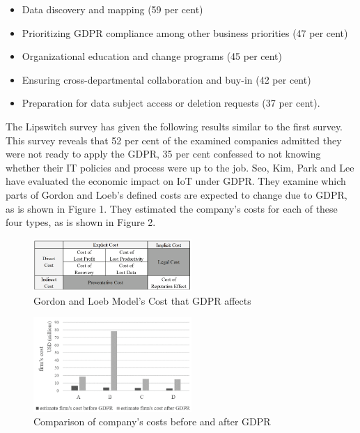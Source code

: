 \documentclass[11pt,english]{article}
\begin{document}
\begin{itemize}
  \item Data discovery and mapping (59 per cent)
  \item Prioritizing GDPR compliance among other business priorities (47 per cent)
  \item Organizational education and change programs (45 per cent)
  \item Ensuring cross-departmental collaboration and buy-in (42 per cent)
  \item Preparation for data subject access or deletion requests (37 per cent).
\end{itemize}
\quad The Lipswitch survey \cite{lipswitch} has given the following results similar to the first survey. This survey reveals that 52 per cent of the examined companies admitted they were not ready to apply the GDPR, 35 per cent confessed to not knowing whether their IT policies and process were up to the job. Seo, Kim, Park and Lee \cite{8190804} have evaluated the economic impact on IoT under
GDPR. They examine which parts of Gordon and Loeb's defined costs \cite{gordon2002economics} are expected to change due to GDPR, as is shown in Figure 1. They estimated the company’s costs for each of these four types, as is shown in Figure 2.
\begin{figure}[htp]
    \centering
    \includegraphics[width=6cm]{costs}
    \caption{Gordon and Loeb Model’s Cost that GDPR affects}
    \label{fig:costs}
\end{figure}
\begin{figure}[htp]
    \centering
    \includegraphics[width=6cm]{comparation}
    \caption{Comparison of company’s costs before and after GDPR}
    \label{fig:comparation}
\end{figure}
\end{document}
